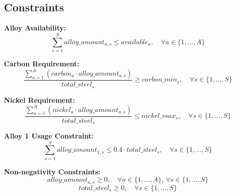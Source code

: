 \documentclass{article}
\begin{document}
\subsection*{Constraints}

\textbf{Alloy Availability:}
\[
\sum_{s=1}^{S} alloy\_amount_{a,s} \leq available_a, \quad \forall a \in \{1, \ldots, A\}
\]

\textbf{Carbon Requirement:}
\[
\frac{\sum_{a=1}^{A} (carbon_a \cdot alloy\_amount_{a,s})}{total\_steel_s} \geq carbon\_min_s, \quad \forall s \in \{1, \ldots, S\}
\]

\textbf{Nickel Requirement:}
\[
\frac{\sum_{a=1}^{A} (nickel_a \cdot alloy\_amount_{a,s})}{total\_steel_s} \leq nickel\_max_s, \quad \forall s \in \{1, \ldots, S\}
\]

\textbf{Alloy 1 Usage Constraint:}
\[
\sum_{s=1}^{S} alloy\_amount_{1,s} \leq 0.4 \cdot total\_steel_s, \quad \forall s \in \{1, \ldots, S\}
\]

\textbf{Non-negativity Constraints:}
\[
alloy\_amount_{a,s} \geq 0, \quad \forall a \in \{1, \ldots, A\},\, \forall s \in \{1, \ldots, S\}
\]
\[
total\_steel_s \geq 0, \quad \forall s \in \{1, \ldots, S\}
\]
\end{document}
